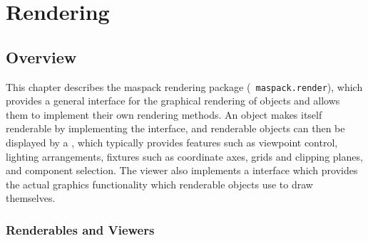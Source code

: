

\chapter{Rendering}

\section{Overview}

This chapter describes the maspack rendering package ({\tt
maspack.render}), which provides a general interface for the graphical
rendering of objects and allows them to implement their own rendering
methods.  An object makes itself renderable by implementing the
 interface, and renderable
objects can then be displayed by a ,
which typically provides features such as viewpoint control, lighting
arrangements, fixtures such as coordinate axes, grids and clipping
planes, and component selection. The viewer also implements a
 interface which provides the
actual graphics functionality which renderable objects use to draw
themselves.

\subsection{Renderables and Viewers}
\label{renderersViewers:sec}

